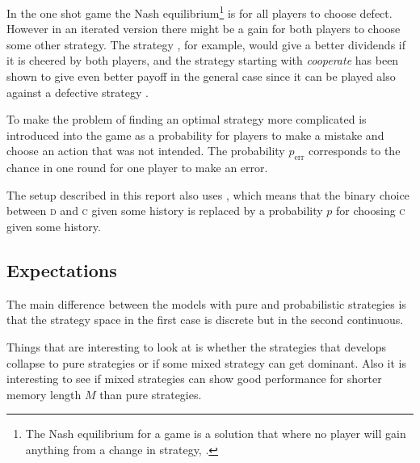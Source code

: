 In the one shot game the Nash equilibrium\footnote{The Nash equilibrium for a game is a solution that where no player will gain anything from a change in strategy, \cite{nash:1950}.} is for all players to choose defect. However in an iterated version there might be a gain for both players to choose some other strategy. The strategy , for example, would give a better dividends if it is cheered by both players, and the strategy  starting with \textit{cooperate} has been shown to give even better payoff in the general case since it can be played also against a defective strategy \cite{axelrod:1984}.

To make the problem of finding an optimal strategy more complicated  is introduced into the game as a probability for players to make a mistake and choose an action that was not intended. The probability $p_{\mathrm{err}}$ corresponds to the chance in one round for one player to make an error. %


The setup described in this report also uses , which means that the binary choice between \textsc{d} and \textsc{c} given some history is replaced by a probability $p$ for choosing \textsc{c} given some history. %

\subsection{Expectations}
The main difference between the models with pure and probabilistic strategies is that the strategy space in the first case is discrete but in the second continuous.

Things that are interesting to look at is whether the strategies that develops collapse to pure strategies or if some mixed strategy can get dominant. Also it is interesting to see if mixed strategies can show good performance for shorter memory length $M$ than pure strategies.

